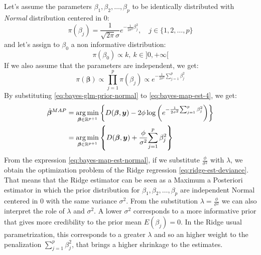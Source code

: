 \documentclass[a4paper, nobind]{templates/ociamthesis}
\theoremstyle{definition}
\theoremstyle{definition}
\theoremstyle{definition}
\theoremstyle{remark}
\begin{document}
Let's assume the parameters \(\beta_1, \beta_2, \dots, \beta_p\) to be identically distributed with \emph{Normal} distribution centered in \(0\):
\[
\pi(\beta_j) = \frac{1}{\sqrt{2\pi}\sigma}e^{-\frac{1}{2\sigma^2}\beta_j^2}, \quad j\in\{1,2,\dots,p\}
\]
and let's assign to \(\beta_0\) a non informative distribution:
\[
\pi(\beta_0) \propto k, \ k\in]0,+\infty[
\]
If we also assume that the parameters are independent, we get:
\begin{equation}
\label{eq:bayes-glm-prior-normal}
\pi(\boldsymbol{\beta}) \propto \prod_{j=1}^{p}{\pi(\beta_j)} \propto e^{-\frac{1}{2\sigma^2}{\sum_{j=1}^{p}{\beta_j^2}}} 
\end{equation}
By substituting \eqref{eq:bayes-glm-prior-normal} to \eqref{eq:bayes-map-est-4}, we get:
\begin{align}
\nonumber
\hat{\boldsymbol{\beta}}^{MAP} & =
\operatorname*{arg\,min}_{\boldsymbol{\beta}\in\mathbb{R}^{p+1}}{\left\{
D(\boldsymbol{\beta}, \boldsymbol{y}) -2\phi \log{\left(e^{-\frac{1}{2\sigma^2}{\sum_{j=1}^{p}{\beta_j^2}}}\right)} \right\}} \\
\label{eq:bayes-map-est-normal}
& = \operatorname*{arg\,min}_{\boldsymbol{\beta}\in\mathbb{R}^{p+1}}{\left\{
D(\boldsymbol{\beta}, \boldsymbol{y}) + \frac{\phi}{\sigma^2} {\sum_{j=1}^{p}{\beta_j^2}}\right\}}
\end{align}
From the expression \eqref{eq:bayes-map-est-normal}, if we substitute \(\frac{\phi}{\sigma^2}\) with \(\lambda\), we obtain the optimization problem of the Ridge regression \eqref{eq:ridge-est-deviance}. That means that the Ridge estimator can be seen as a Maximum a Posteriori estimator in which the prior distribution for \(\beta_1, \beta_2, \dots, \beta_p\) are independent Normal centered in \(0\) with the same variance \(\sigma^2\). From the substitution \(\lambda=\frac{\phi}{\sigma^2}\) we can also interpret the role of \(\lambda\) and \(\sigma^2\). A lower \(\sigma^2\) corresponds to a more informative prior that gives more credibility to the prior mean \(E(\beta_j)=0\). In the Ridge usual parametrization, this corresponds to a greater \(\lambda\) and so an higher weight to the penalization \(\sum_{j=1}^{p}{\beta_j^2}\), that brings a higher shrinkage to the estimates.
\end{document}

